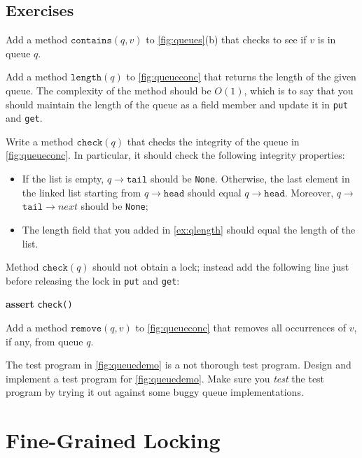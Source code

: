\documentclass{report}
\newenvironment{code}{
\tcolorbox
}{
\endtcolorbox
}
\begin{document}
\section*{Exercises}
\begin{problems}
\item \label{ex:qcontains} Add a method $\mathtt{contains}(q, v)$ to \autoref{fig:queues}(b)
that checks to see if $v$ is in queue $q$.
\item Add a method $\mathtt{length}(q)$ to \autoref{fig:queueconc} that returns the length of the given queue.
The complexity of the method should be $O(1)$, which is to say that you should maintain
the length of the queue as a field member and update it in \texttt{put} and \texttt{get}.
\item \label{ex:qlength} Write a method $\mathtt{check}(q)$
that checks the integrity of the queue in \autoref{fig:queueconc}.
In particular, it should check the following integrity properties:
\begin{itemize}
\item If the list is empty, $q$$\rightarrow$$\mathtt{tail}$ should be \texttt{None}.
Otherwise, the last element in the linked list starting from $q$$\rightarrow$$\mathtt{head}$
should equal $q$$\rightarrow$$\mathtt{head}$. Moreover,
$q$$\rightarrow$$\texttt{tail}$$\rightarrow$$next$ should be \texttt{None};
\item The length field that you added in \autoref{ex:qlength} should equal the length
of the list.
\end{itemize}
Method $\mathtt{check}(q)$ should not obtain a lock; instead add the following line
just before releasing the lock in \texttt{put} and \texttt{get}:
\begin{code}
\textbf{assert} \texttt{check()}
\end{code}
\item \label{ex:qremove} Add a method $\mathtt{remove}(q, v)$ to \autoref{fig:queueconc}
that removes all occurrences of $v$, if any, from queue $q$.
\item The test program in \autoref{fig:queuedemo} is a not thorough test program.
Design and implement a test program for \autoref{fig:queuedemo}.
Make sure you \emph{test} the test program by trying it out against some buggy
queue implementations.
\end{problems}

\chapter{Fine-Grained Locking}
\label{ch:finegrained}
\end{document}
